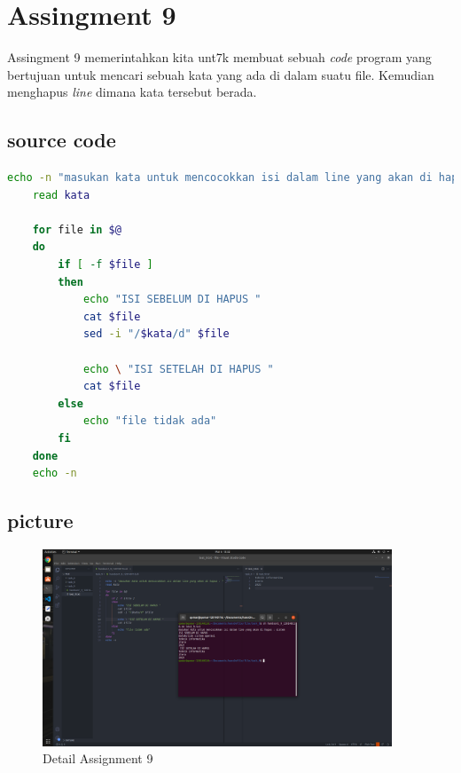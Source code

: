\documentclass[11pt,a4paper]{article}
\begin{document}
\newpage
\section{Assingment 9}
Assingment 9 memerintahkan kita unt7k membuat sebuah \textit{code} program yang bertujuan untuk mencari sebuah kata yang ada di dalam suatu file.
Kemudian menghapus \textit{line} dimana kata tersebut berada.
\subsection*{source code}
\begin{lstlisting}[language=bash, caption={source code Assingment 9}]
	echo -n "masukan kata untuk mencocokkan isi dalam line yang akan di hapus : "
	read kata

	for file in $@
	do
		if [ -f $file ]
		then
			echo "ISI SEBELUM DI HAPUS "
			cat $file
			sed -i "/$kata/d" $file

			echo \ "ISI SETELAH DI HAPUS "
			cat $file
		else 
			echo "file tidak ada"
		fi
	done
	echo -n
\end{lstlisting}

\subsection*{picture}
\begin{figure}[h]
	\centering
	\includegraphics[width=0.93\textwidth]{figure/task_9.png}
	\caption{Detail Assignment 9}
\end{figure}





\newpage
\end{document}
